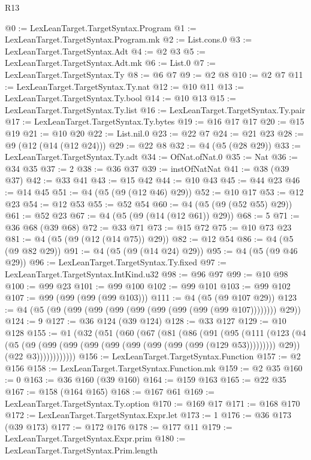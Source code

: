 \begin{lexlean}{R13}
\begin{coremodule}
@0 := LexLeanTarget.TargetSyntax.Program
@1 := LexLeanTarget.TargetSyntax.Program.mk
@2 := List.cons.{0}
@3 := LexLeanTarget.TargetSyntax.Adt
@4 := @2 @3
@5 := LexLeanTarget.TargetSyntax.Adt.mk
@6 := List.{0}
@7 := LexLeanTarget.TargetSyntax.Ty
@8 := @6 @7
@9 := @2 @8
@10 := @2 @7
@11 := LexLeanTarget.TargetSyntax.Ty.nat
@12 := @10 @11
@13 := LexLeanTarget.TargetSyntax.Ty.bool
@14 := @10 @13
@15 := LexLeanTarget.TargetSyntax.Ty.list
@16 := LexLeanTarget.TargetSyntax.Ty.pair
@17 := LexLeanTarget.TargetSyntax.Ty.bytes
@19 := @16 @17 @17
@20 := @15 @19
@21 := @10 @20
@22 := List.nil.{0}
@23 := @22 @7
@24 := @21 @23
@28 := @9 (@12 (@14 (@12 @24)))
@29 := @22 @8
@32 := @4 (@5 (@28 @29))
@33 := LexLeanTarget.TargetSyntax.Ty.adt
@34 := OfNat.ofNat.{0}
@35 := Nat
@36 := @34 @35
@37 := 2
@38 := @36 @37
@39 := instOfNatNat
@41 := @38 (@39 @37)
@42 := @33 @41
@43 := @15 @42
@44 := @10 @43
@45 := @44 @23
@46 := @14 @45
@51 := @4 (@5 (@9 (@12 @46) @29))
@52 := @10 @17
@53 := @12 @23
@54 := @12 @53
@55 := @52 @54
@60 := @4 (@5 (@9 (@52 @55) @29))
@61 := @52 @23
@67 := @4 (@5 (@9 (@14 (@12 @61)) @29))
@68 := 5
@71 := @36 @68 (@39 @68)
@72 := @33 @71
@73 := @15 @72
@75 := @10 @73 @23
@81 := @4 (@5 (@9 (@12 (@14 @75)) @29))
@82 := @12 @54
@86 := @4 (@5 (@9 @82 @29))
@91 := @4 (@5 (@9 (@14 @24) @29))
@95 := @4 (@5 (@9 @46 @29))
@96 := LexLeanTarget.TargetSyntax.Ty.fixed
@97 := LexLeanTarget.TargetSyntax.IntKind.u32
@98 := @96 @97
@99 := @10 @98
@100 := @99 @23
@101 := @99 @100
@102 := @99 @101
@103 := @99 @102
@107 := @99 (@99 (@99 (@99 @103)))
@111 := @4 (@5 (@9 @107 @29))
@123 := @4 (@5 (@9 (@99 (@99 (@99 (@99 (@99 (@99 (@99 (@99 @107)))))))) @29))
@124 := 9
@127 := @36 @124 (@39 @124)
@128 := @33 @127
@129 := @10 @128
@155 := @1
    (@32
      (@51
        (@60
          (@67
            (@81
              (@86
                (@91
                  (@95
                    (@111
                      (@123
                        (@4
                          (@5 (@9 (@99 (@99 (@99 (@99 (@99 (@99 (@99 (@99 (@129 @53))))))))) @29))
                          (@22 @3))))))))))))
@156 := LexLeanTarget.TargetSyntax.Function
@157 := @2 @156
@158 := LexLeanTarget.TargetSyntax.Function.mk
@159 := @2 @35
@160 := 0
@163 := @36 @160 (@39 @160)
@164 := @159 @163
@165 := @22 @35
@167 := @158 (@164 @165)
@168 := @167 @61
@169 := LexLeanTarget.TargetSyntax.Ty.option
@170 := @169 @17
@171 := @168 @170
@172 := LexLeanTarget.TargetSyntax.Expr.let
@173 := 1
@176 := @36 @173 (@39 @173)
@177 := @172 @176
@178 := @177 @11
@179 := LexLeanTarget.TargetSyntax.Expr.prim
@180 := LexLeanTarget.TargetSyntax.Prim.length

\end{coremodule}
\end{lexlean}
